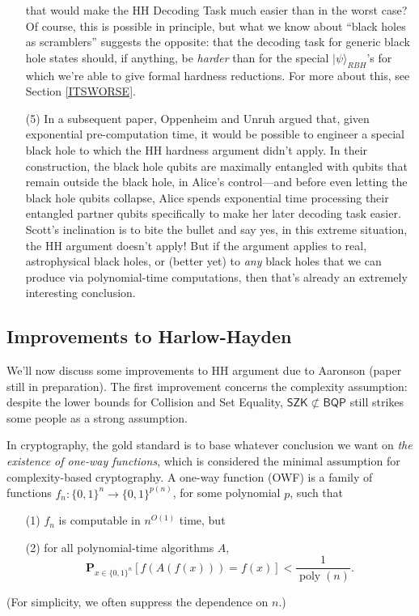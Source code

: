 \documentclass[11pt]{report}
\theoremstyle{plain}
\theoremstyle{definition}
\renewcommand{\Pr}{\mathbf{P}}
\renewcommand{\ket}[1]{|#1\rangle}
\begin{document}
\begin{enumerate}
        that would make the HH Decoding Task much easier than in the worst case?  Of course, this is possible in principle, but what we know about ``black holes as scramblers'' suggests the opposite: that the decoding task for generic black hole states should, if anything, be {\em harder} than for the special $\ket{\psi}_{RBH}$'s for which we're able to give
        formal hardness reductions.  For more about this, see Section \ref{ITSWORSE}.
\item[(5)] In a subsequent paper, Oppenheim and Unruh \cite{OU14} argued that, given exponential pre-computation time, it would be possible to engineer a special black hole to which the HH hardness argument didn't apply.  In their construction, the black hole qubits are maximally entangled with qubits that remain outside the black hole, in Alice's control---and before even letting the black hole qubits collapse, Alice spends exponential time processing their entangled partner qubits specifically to make her later decoding task easier.  Scott's inclination is to bite the bullet and say yes, in this extreme situation, the HH argument doesn't apply!  But if the argument applies to real, astrophysical black holes, or (better yet) to {\em any} black holes that we can produce via polynomial-time computations, then that's already an extremely interesting conclusion.
\end{enumerate}

\subsection{Improvements to Harlow-Hayden}

We'll now discuss some improvements to HH argument due to Aaronson (paper still in preparation).  The first improvement concerns the complexity assumption: despite the lower bounds for Collision and Set Equality, $\mathsf{SZK}\not\subset \mathsf{BQP}$ still strikes some people as a strong assumption.

In cryptography, the gold standard is to base whatever conclusion we want on {\em the existence of one-way functions}, which is considered the minimal assumption for complexity-based cryptography.  A one-way function (OWF) is a family of functions $f_n:\{0,1\}^n\longrightarrow \{0,1\}^{p(n)}$, for some polynomial $p$, such that
\begin{enumerate}
\item[(1)] $f_n$ is computable in $n^{O(1)}$ time, but
\item[(2)] for all polynomial-time algorithms $A$,
$$ \Pr_{x\in \{0,1\}^n}[f(A(f(x)))=f(x)]<\frac{1}{\operatorname*{poly}(n)}. $$
\end{enumerate}
(For simplicity, we often suppress the dependence on $n$.)
\end{document}

